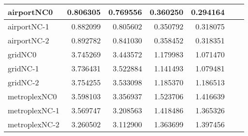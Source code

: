 \begin{longtable}{|l|r|r|r|r|r|r|}
airportNC0 & 0.806305 & 0.769556 & 0.360250 & 0.294164 \\ \hline
airportNC-1 & 0.882099 & 0.805602 & 0.350792 & 0.318075 \\ \hline
airportNC-2 & 0.892782 & 0.841030 & 0.358452 & 0.318351 \\ \hline
gridNC0 & 3.745269 & 3.443572 & 1.179983 & 1.071470 \\ \hline
gridNC-1 & 3.736431 & 3.522884 & 1.141493 & 1.079481 \\ \hline
gridNC-2 & 3.754255 & 3.533098 & 1.185370 & 1.186513 \\ \hline
metroplexNC0 & 3.598103 & 3.356937 & 1.523706 & 1.416639 \\ \hline
metroplexNC-1 & 3.569747 & 3.208563 & 1.418486 & 1.365326 \\ \hline
metroplexNC-2 & 3.260502 & 3.112900 & 1.363699 & 1.397456 \\ \hline
\end{longtable}
